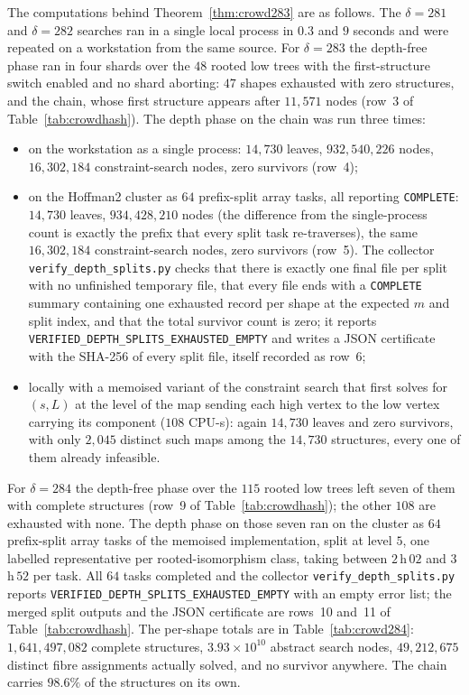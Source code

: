 \documentclass[11pt,a4paper]{article}
\theoremstyle{plain}
\theoremstyle{remark}
\newcommand{\file}[1]{\texttt{#1}}
\newcommand{\tok}[1]{\texttt{#1}}
\newcommand{\bk}{\discretionary{}{}{}}
\begin{document}
The computations behind Theorem~\ref{thm:crowd283} are as follows.  The
$\delta=281$ and $\delta=282$ searches ran in a single local process in $0.3$
and $9$ seconds and were repeated on a workstation from the same source.  For
$\delta=283$ the depth-free phase ran in four shards over the $48$ rooted low
trees with the first-structure switch enabled and no shard aborting: $47$ shapes
exhausted with zero structures, and the chain, whose first structure appears
after $11{,}571$ nodes (row~3 of Table~\ref{tab:crowdhash}).  The
depth phase on the chain was run three times:
\begin{itemize}
\item on the workstation as a single process:
  $14{,}730$ leaves, $932{,}540{,}226$ nodes, $16{,}302{,}184$ constraint-search
  nodes, zero survivors (row~4);
\item on the Hoffman2 cluster as $64$ prefix-split array tasks, all reporting
  \texttt{COMPLETE}: $14{,}730$ leaves, $934{,}428{,}210$ nodes (the difference
  from the single-process count is exactly the prefix that every split task
  re-traverses), the same $16{,}302{,}184$ constraint-search nodes, zero
  survivors (row~5).
  The collector \file{verify\_depth\_splits.py} checks that there is exactly one
  final file per split with no unfinished temporary file, that every file ends
  with a \texttt{COMPLETE} summary containing one exhausted record per shape at
  the expected $m$ and split index, and that the total survivor count is zero;
  it reports \tok{VERIFIED\_\bk DEPTH\_\bk SPLITS\_\bk EXHAUSTED\_\bk EMPTY}
  and writes a JSON certificate with the SHA-256 of every split file, itself
  recorded as row~6;
\item locally with a memoised variant of the constraint search that first solves
  for $(s,L)$ at the level of the map sending each high vertex to the low vertex
  carrying its component ($108$ CPU-s): again $14{,}730$ leaves and zero
  survivors, with only $2{,}045$ distinct such maps among the $14{,}730$
  structures, every one of them already infeasible.
\end{itemize}

For $\delta=284$ the depth-free phase over the $115$ rooted low trees left seven
of them with complete structures (row~9 of Table~\ref{tab:crowdhash}); the other
$108$ are exhausted with none.  The depth phase on those seven ran on the cluster
as $64$ prefix-split array tasks of the memoised implementation, split at level
$5$, one labelled representative per rooted-isomorphism class, taking between
$2$\,h\,$02$ and $3$\,h\,$52$ per task.  All $64$ tasks completed and the
collector \file{verify\_depth\_splits.py} reports
\tok{VERIFIED\_\bk DEPTH\_\bk SPLITS\_\bk EXHAUSTED\_\bk EMPTY} with an empty
error list; the merged split outputs and the JSON certificate are rows~10
and~11 of Table~\ref{tab:crowdhash}.  The per-shape totals are in
Table~\ref{tab:crowd284}: $1{,}641{,}497{,}082$ complete structures,
$3.93\times10^{10}$ abstract search nodes, $49{,}212{,}675$ distinct fibre
assignments actually solved, and no survivor anywhere.  The chain carries
$98.6\%$ of the structures on its own.
\end{document}
